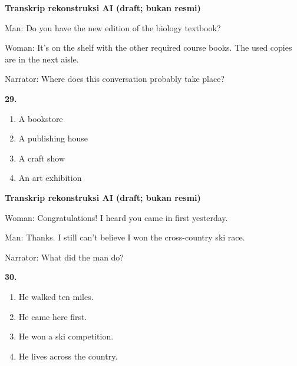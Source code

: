 \documentclass[12pt]{article}
\begin{document}
\par
\vspace{0.25\baselineskip}
\begin{exampleblock}
\textbf{Transkrip rekonstruksi AI (draft; bukan resmi)}\par
Man: Do you have the new edition of the biology textbook?\par
Woman: It's on the shelf with the other required course books. The used copies are in the next aisle.\par
Narrator: Where does this conversation probably take place?\par
\end{exampleblock}
\noindent\textbf{29.}
\begin{enumerate}[label=(\Alph*),leftmargin=*,itemsep=0.2em]
\item A bookstore
\item A publishing house
\item A craft show
\item An art exhibition
\end{enumerate}
\par
\vspace{0.25\baselineskip}
\begin{exampleblock}
\textbf{Transkrip rekonstruksi AI (draft; bukan resmi)}\par
Woman: Congratulations! I heard you came in first yesterday.\par
Man: Thanks. I still can't believe I won the cross-country ski race.\par
Narrator: What did the man do?\par
\end{exampleblock}
\noindent\textbf{30.}
\begin{enumerate}[label=(\Alph*),leftmargin=*,itemsep=0.2em]
\item He walked ten miles.
\item He came here first.
\item He won a ski competition.
\item He lives across the country.
\end{enumerate}
\par
\vspace{0.25\baselineskip}
\end{document}
